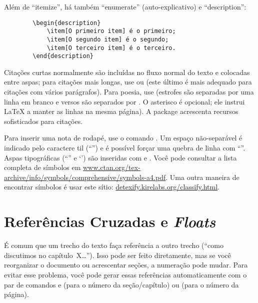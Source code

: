 Além de ``itemize'', há também ``enumerate'' (auto-explicativo) e ``description'':

\begin{verbatim}
        \begin{description}
            \item[O primeiro item] é o primeiro;
            \item[O segundo item] é o segundo;
            \item[O terceiro item] é o terceiro.
        \end{description}
\end{verbatim}

Citações curtas normalmente são incluídas no fluxo normal do texto e colocadas
entre aspas; para citações mais longas, use  ou
 (este último é mais adequado para citações com
vários parágrafos). Para poesia, use  (estrofes são separadas por
uma linha em branco e versos são separados por \cmd{\sla\sla{}*}. O asterisco
é opcional; ele instrui \LaTeX{} a manter as linhas na mesma página). A package
 acrescenta recursos sofisticados para citações.

\enlargethispage{\baselineskip}

Para inserir uma nota de rodapé, use o comando
. Um espaço
não-separável é indicado pelo caractere til (``\cmd{\textasciitilde{}}'')
e é possível forçar uma quebra de linha com ``\cmd{\sla\sla{}}''. Aspas
tipográficas (``'' e `') são inseridas com
\texttt{\textasciigrave\textasciigrave\textquotesingle\textquotesingle} e
\texttt{\textasciigrave\textquotesingle}. Você pode consultar a lista completa de
símbolos em \url{www.ctan.org/tex-archive/info/symbols/comprehensive/symbols-a4.pdf}.
Uma outra maneira de encontrar símbolos é usar este sítio: \url{detexify.kirelabs.org/classify.html}.

\section{Referências Cruzadas e \emph{Floats}}
\label{sec:refs}

É comum que um trecho do texto faça referência a outro trecho (``como
discutimos no capítulo~X\ldots''). Isso pode ser feito diretamente, mas
se você reorganizar o documento ou acrescentar seções, a numeração pode
mudar. Para evitar esse problema, você pode gerar essas referências
automaticamente com o par de comandos  e
 (para o número da seção/capítulo) ou
 (para o número da página).


